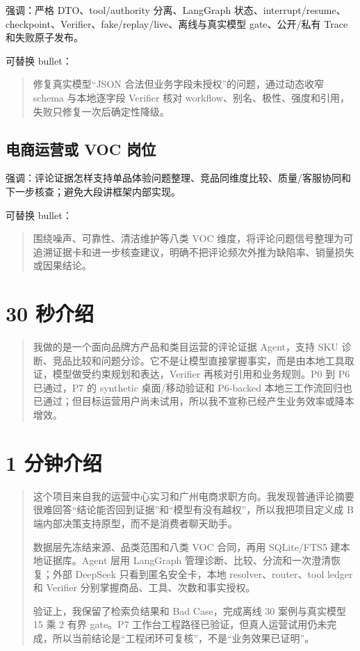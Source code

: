 强调：严格 DTO、tool/authority 分离、LangGraph 状态、interrupt/resume、checkpoint、Verifier、fake/replay/live、离线与真实模型 gate、公开/私有 Trace 和失败原子发布。

可替换 bullet：

\begin{quote}
修复真实模型“JSON 合法但业务字段未授权”的问题，通过动态收窄 schema 与本地逐字段 Verifier 核对 workflow、别名、极性、强度和引用，失败只修复一次后确定性降级。
\end{quote}

\subsection{电商运营或 VOC 岗位}

强调：评论证据怎样支持单品体验问题整理、竞品同维度比较、质量/客服协同和下一步核查；避免大段讲框架内部实现。

可替换 bullet：

\begin{quote}
围绕噪声、可靠性、清洁维护等八类 VOC 维度，将评论问题信号整理为可追溯证据卡和进一步核查建议，明确不把评论频次外推为缺陷率、销量损失或因果结论。
\end{quote}

\section{30 秒介绍}

\begin{quote}
我做的是一个面向品牌方产品和类目运营的评论证据 Agent，支持 SKU 诊断、竞品比较和问题分诊。它不是让模型直接掌握事实，而是由本地工具取证，模型做受约束规划和表达，Verifier 再核对引用和业务规则。P0 到 P6 已通过，P7 的 synthetic 桌面/移动验证和 P6-backed 本地三工作流回归也已通过；但目标运营用户尚未试用，所以我不宣称已经产生业务效率或降本增效。
\end{quote}

\section{1 分钟介绍}

\begin{quote}
这个项目来自我的运营中心实习和广州电商求职方向。我发现普通评论摘要很难回答“结论能否回到证据”和“模型有没有越权”，所以我把项目定义成 B 端内部决策支持原型，而不是消费者聊天助手。

数据层先冻结来源、品类范围和八类 VOC 合同，再用 SQLite/FTS5 建本地证据库。Agent 层用 LangGraph 管理诊断、比较、分流和一次澄清恢复；外部 DeepSeek 只看到匿名安全卡，本地 resolver、router、tool ledger 和 Verifier 分别掌握商品、工具、次数和事实授权。

验证上，我保留了检索负结果和 Bad Case，完成离线 30 案例与真实模型 15 乘 2 有界 gate。P7 工作台工程路径已验证，但真人运营试用仍未完成，所以当前结论是“工程闭环可复核”，不是“业务效果已证明”。
\end{quote}

